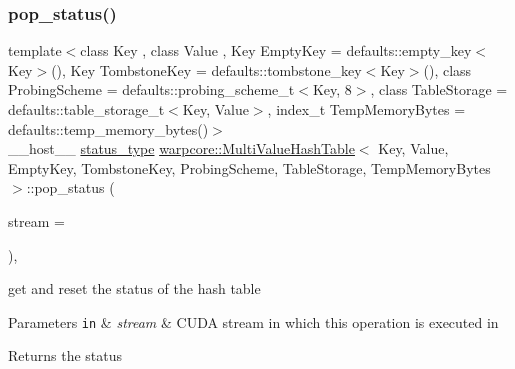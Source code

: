\subsubsection{\texorpdfstring{pop\+\_\+status()}{pop\_status()}}
{\footnotesize\ttfamily template$<$class Key , class Value , Key Empty\+Key = defaults\+::empty\+\_\+key$<$\+Key$>$(), Key Tombstone\+Key = defaults\+::tombstone\+\_\+key$<$\+Key$>$(), class Probing\+Scheme  = defaults\+::probing\+\_\+scheme\+\_\+t$<$\+Key, 8$>$, class Table\+Storage  = defaults\+::table\+\_\+storage\+\_\+t$<$\+Key, Value$>$, index\+\_\+t Temp\+Memory\+Bytes = defaults\+::temp\+\_\+memory\+\_\+bytes()$>$ \\
\+\_\+\+\_\+host\+\_\+\+\_\+ \hyperlink{classwarpcore_1_1Status}{status\+\_\+type} \hyperlink{classwarpcore_1_1MultiValueHashTable}{warpcore\+::\+Multi\+Value\+Hash\+Table}$<$ Key, Value, Empty\+Key, Tombstone\+Key, Probing\+Scheme, Table\+Storage, Temp\+Memory\+Bytes $>$\+::pop\+\_\+status (\begin{DoxyParamCaption}\item[{const cuda\+Stream\+\_\+t}]{stream = {} }\end{DoxyParamCaption})\hspace{0.3cm}{\ttfamily [inline]}, {\ttfamily [noexcept]}}



get and reset the status of the hash table 


\begin{DoxyParams}[1]{Parameters}
\mbox{\tt in}  & {\em stream} & C\+U\+DA stream in which this operation is executed in \\
\hline
\end{DoxyParams}
\begin{DoxyReturn}{Returns}
the status 
\end{DoxyReturn}
\mbox{\label{classwarpcore_1_1MultiValueHashTable_a7f64ccf2789b8eaf65251600bb36ca23}} 
